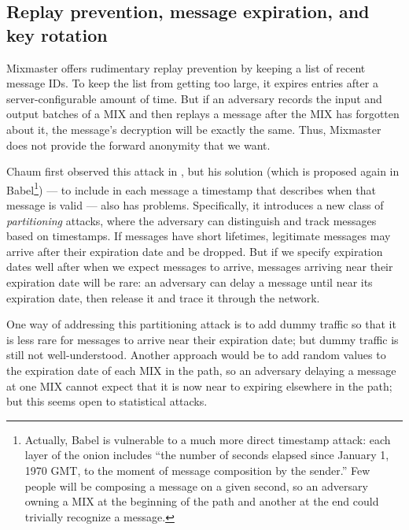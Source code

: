 \documentclass[11pt]{IEEEtran}
\begin{document}
\subsection{Replay prevention, message expiration, and key rotation}

Mixmaster offers rudimentary replay prevention by keeping a list of recent
message IDs. To keep the list from getting too large, it expires entries
after a server-configurable amount of time. But if an adversary records
the input and output batches of a MIX and then replays a message after
the MIX has forgotten about it, the message's decryption will be exactly
the same. Thus, Mixmaster does not provide the forward anonymity that we want.

Chaum first observed this attack in \cite{chaum-mix},
but his solution (which is proposed again in Babel\footnote{
  Actually, Babel is vulnerable to a much more direct timestamp attack:
  each layer of the onion includes ``the number of seconds
  elapsed since January 1, 1970 GMT, to the moment of message composition
  by the sender.'' Few people will be composing a message on a given
  second, so an adversary owning a MIX at the beginning of the path and
  another at the end could trivially recognize a message.
}) --- to include in each message a timestamp that describes when that message
is valid --- also has problems. Specifically, it introduces a new class
of \emph{partitioning} attacks, where the adversary can distinguish and
track messages based on timestamps. If messages have short lifetimes,
legitimate messages may arrive after their expiration date and be
dropped. But if we specify expiration dates well after when we expect
messages to arrive, messages arriving near their expiration date will be
rare: an adversary can delay a message until near its expiration date,
then release it and trace it through the network.


One way of addressing this partitioning attack is to add dummy traffic
so that it is less rare for messages to arrive near their expiration date;
but dummy traffic is still not well-understood. Another approach would
be to add random values to the expiration date of each MIX in the path,
so an adversary delaying a message at one MIX cannot expect that it
is now near to expiring elsewhere in the path; but this seems open to
statistical attacks.

\end{document}
